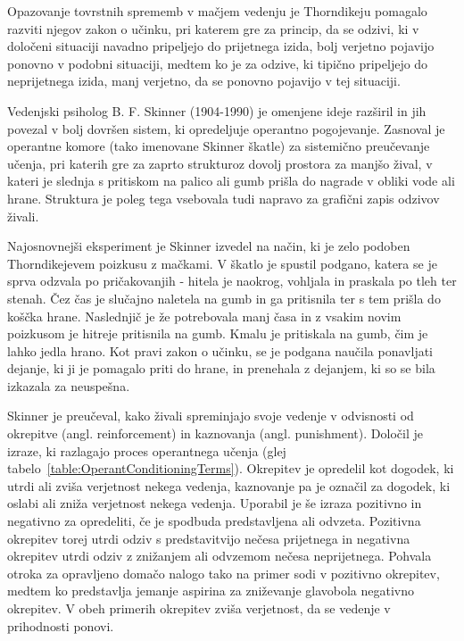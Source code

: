 \documentclass[a4paper, oneside, 12pt]{report}
\begin{document}

Opazovanje tovrstnih sprememb v mačjem vedenju je Thorndikeju pomagalo razviti njegov zakon o učinku, pri katerem gre za princip, da se odzivi, ki v določeni situaciji navadno pripeljejo do prijetnega izida, bolj verjetno pojavijo ponovno v podobni situaciji, medtem ko je za odzive, ki tipično pripeljejo do neprijetnega izida, manj verjetno, da se ponovno pojavijo v tej situaciji.~\cite{AnimalIntelligence2}

Vedenjski psiholog B. F. Skinner (1904-1990) je omenjene ideje razširil in jih povezal v bolj dovršen sistem, ki opredeljuje operantno pogojevanje. Zasnoval je operantne komore (tako imenovane Skinner škatle) za sistemično preučevanje učenja, pri katerih gre za zaprto strukturoz dovolj prostora za manjšo žival, v kateri je slednja s pritiskom na palico ali gumb prišla do nagrade v obliki vode ali hrane. Struktura je poleg tega vsebovala tudi napravo za grafični zapis odzivov živali.~\cite{IntroductionToPsychology}


Najosnovnejši eksperiment je Skinner izvedel na način, ki je zelo podoben Thorndikejevem poizkusu z mačkami. V škatlo je spustil podgano, katera se je sprva odzvala po pričakovanjih - hitela je naokrog, vohljala in praskala po tleh ter stenah. Čez čas je slučajno naletela na gumb in ga pritisnila ter s tem prišla do koščka hrane. Naslednjič je že potrebovala manj časa in z vsakim novim poizkusom je hitreje pritisnila na gumb. Kmalu je pritiskala na gumb, čim je lahko jedla hrano. Kot pravi zakon o učinku, se je podgana naučila ponavljati dejanje, ki ji je pomagalo priti do hrane, in prenehala z dejanjem, ki so se bila izkazala za neuspešna.~\cite{IntroductionToPsychology}

Skinner je preučeval, kako živali spreminjajo svoje vedenje v odvisnosti od okrepitve (angl. reinforcement) in kaznovanja (angl. punishment). Določil je izraze, ki razlagajo proces operantnega učenja (glej tabelo~\ref{table:OperantConditioningTerms}). Okrepitev je opredelil kot dogodek, ki utrdi ali zviša verjetnost nekega vedenja, kaznovanje pa je označil za dogodek, ki oslabi ali zniža verjetnost nekega vedenja. Uporabil je še izraza pozitivno in negativno za opredeliti, če je spodbuda predstavljena ali odvzeta. Pozitivna okrepitev torej utrdi odziv s predstavitvijo nečesa prijetnega in negativna okrepitev utrdi odziv z znižanjem ali odvzemom nečesa neprijetnega. Pohvala otroka za opravljeno domačo nalogo tako na primer sodi v pozitivno okrepitev, medtem ko predstavlja jemanje aspirina za zniževanje glavobola negativno okrepitev. V obeh primerih okrepitev zviša verjetnost, da se vedenje v prihodnosti ponovi.~\cite{IntroductionToPsychology}
\end{document}
